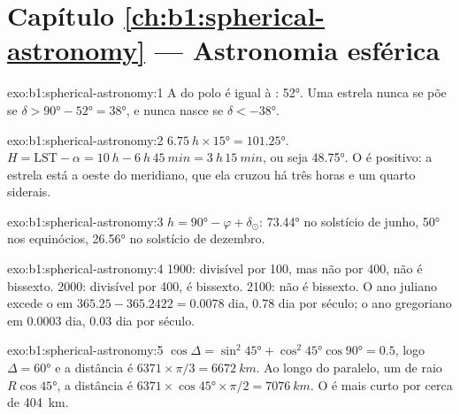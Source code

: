 \section*{Capítulo \ref{ch:b1:spherical-astronomy} --- Astronomia esférica}

\begin{solution}{exo:b1:spherical-astronomy:1}
A  do polo é igual à : \ang{52}. Uma estrela nunca se põe se
$\delta > \ang{90} - \ang{52} = \ang{38}$, e nunca nasce se
$\delta < \ang{-38}$.
\end{solution}

\begin{solution}{exo:b1:spherical-astronomy:2}
$\qty{6.75}{h}\times\ang{15} = \ang{101.25}$. $H = \mathrm{LST} - \alpha =
\qty{10}{h} - \qty{6}{h}\,\qty{45}{min} = \qty{3}{h}\,\qty{15}{min}$, ou seja
\ang{48.75}. O  é positivo: a estrela está a oeste do meridiano, que ela cruzou há três horas e um quarto siderais.
\end{solution}

\begin{solution}{exo:b1:spherical-astronomy:3}
$h = \ang{90} - \varphi + \delta_\odot$: \ang{73.44} no solstício de junho,
\ang{50} nos equinócios, \ang{26.56} no solstício de dezembro.
\end{solution}

\begin{solution}{exo:b1:spherical-astronomy:4}
1900: divisível por 100, mas não por 400, não é bissexto. 2000: divisível por
400, é bissexto. 2100: não é bissexto. O ano juliano excede o  em
$365.25 - 365.2422 = 0.0078$ dia, \num{0.78} dia por século; o ano gregoriano
em $0.0003$ dia, \num{0.03} dia por século.
\end{solution}

\begin{solution}{exo:b1:spherical-astronomy:5}
$\cos\Delta = \sin^2\ang{45} + \cos^2\ang{45}\cos\ang{90} = 0.5$, logo
$\Delta = \ang{60}$ e a distância é $6371\times\pi/3 = \qty{6672}{km}$.
Ao longo do paralelo, um  de raio $R\cos\ang{45}$, a distância é
$6371\times\cos\ang{45}\times\pi/2 = \qty{7076}{km}$. O  é
mais curto por cerca de \qty{404}{km}.
\end{solution}

